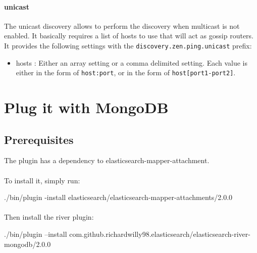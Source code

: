 \documentclass{article}%
\begin{document}
\paragraph{unicast} The unicast discovery allows to perform the discovery when multicast is not enabled. It basically requires a list of hosts to use that will act as gossip routers. It provides the following settings with the \texttt{discovery.zen.ping.unicast} prefix:

\begin{itemize}
	\item hosts : Either an array setting or a comma delimited setting. Each value is either in the form of \texttt{host:port}, or in the form of \texttt{host[port1-port2]}.
\end{itemize}

\section{Plug it with MongoDB}


\subsection{Prerequisites}

The plugin has a dependency to elasticsearch-mapper-attachment.

\paragraph{} To install it, simply run:

\begin{command}
./bin/plugin -install elasticsearch/elasticsearch-mapper-attachments/2.0.0
\end{command}

\paragraph{} Then install the river plugin:

\begin{command}
./bin/plugin --install com.github.richardwilly98.elasticsearch/elasticsearch-river-mongodb/2.0.0
\end{command}
\end{document}
